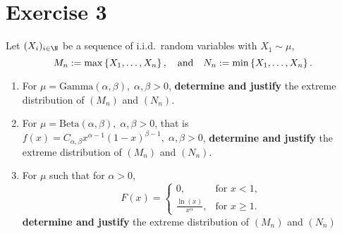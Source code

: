 \section{Exercise 3}

Let $(X_i)_{i\in\N}$ be a sequence of i.i.d.~random variables with $X_1 \sim \mu$,
\[ M_n := \max\left\{ X_1,\ldots, X_n \right\},\hspace*{1em} \mbox{and} \hspace*{1em} N_n := \min\left\{ X_1,\ldots,X_n \right\}. \]
\begin{enumerate}
    \item For $\mu = \mbox{Gamma}(\alpha,\beta),\; \alpha,\beta > 0$, \textbf{determine and justify} the extreme distribution of $(M_n)$ and $(N_n)$.
    \item For $\mu = \mbox{Beta}(\alpha,\beta),\; \alpha,\beta > 0$, that is $f(x) = C_{\alpha,\beta}x^{\alpha-1}(1-x)^{\beta -1},\; \alpha,\beta > 0$, \textbf{determine and justify} the extreme distribution of $(M_n)$ and $(N_n)$.
    \item For $\mu$ such that for $\alpha > 0$,
    \[ F(x) = \begin{cases}
    0, & \mbox{for }x< 1,\\
    \frac{\ln(x)}{x^\alpha}, & \mbox{for }x\geq 1.
    \end{cases} \]
    \textbf{determine and justify} the extreme distribution of $(M_n)$ and $(N_n)$
\end{enumerate}